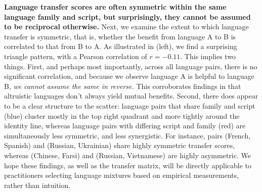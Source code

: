 \textbf{Language transfer scores are often symmetric within the same language family and script, but surprisingly, they cannot be assumed to be reciprocal otherwise.}
Next, we examine the extent to which language transfer is symmetric, that is, whether the benefit from language A to B is correlated to that from B to A. 
As illustrated in  (left), we find a surprising triangle pattern, with a Pearson correlation of $r = -0.11$.
This implies two things.
First, and perhaps most importantly, across all language pairs, there is no significant correlation, and because we observe language A is helpful to language B, \emph{we cannot assume the same in reverse.}
This corroborates findings in \citet{li2025rethinking} that altruistic languages don't always yield mutual benefits.
Second, there does appear to be a clear structure to the scatter: language pairs that share family and script (blue) cluster mostly in the top right quadrant and more tightly around the identity line, whereas language pairs with differing script and family (red) are simultaneously less symmetric, and less synergistic. 
For instance, pairs (French, Spanish) and (Russian, Ukrainian) share highly symmetric transfer scores, whereas (Chinese, Farsi) and (Russian, Vietnamese) are highly asymmetric.
We hope these findings, as well as the  transfer matrix, will be directly applicable to practitioners selecting language mixtures based on empirical measurements, rather than intuition.



